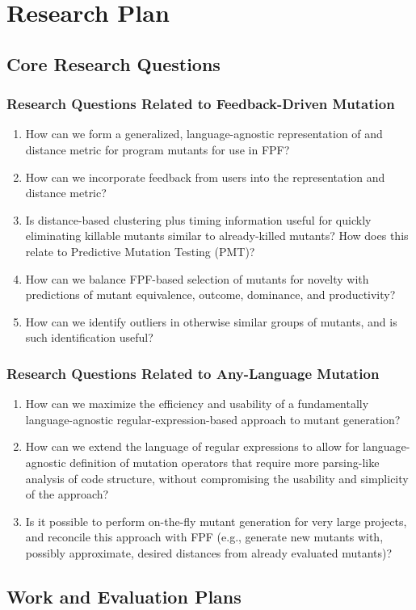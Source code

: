 \section{Research Plan}

\subsection{Core Research Questions}

\subsubsection{Research Questions Related to Feedback-Driven Mutation}

\begin{enumerate}
\item How can we form a generalized, language-agnostic representation
  of and distance metric for program mutants for use in FPF?
\item How can we incorporate feedback from users into the
  representation and distance metric?
\item Is distance-based clustering plus timing information useful for quickly
  eliminating killable mutants similar to already-killed mutants?  How
  does this relate to Predictive Mutation Testing (PMT)?
\item How can we balance FPF-based selection of mutants for novelty
  with predictions of mutant equivalence, outcome, dominance, and
  productivity?
\item How can we identify outliers in otherwise similar groups of
  mutants, and is such identification useful?
\end{enumerate}

\subsubsection{Research Questions Related to Any-Language Mutation}

\begin{enumerate}
\item How can we maximize the efficiency and usability of a
  fundamentally language-agnostic regular-expression-based approach to
  mutant generation?
\item How can we extend the language of regular expressions to allow
  for language-agnostic definition of mutation operators that require
  more parsing-like analysis of code structure, without compromising
  the usability and simplicity of the approach?
\item Is it possible to perform on-the-fly mutant generation for very
  large projects, and reconcile this approach with FPF (e.g., generate
  new mutants with, possibly approximate, desired distances from
  already evaluated mutants)?
\end{enumerate}

\subsection{Work and Evaluation Plans}
\label{sec:workplan}

